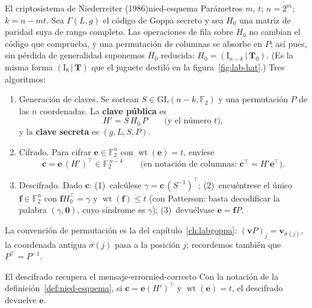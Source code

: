 \documentclass[11pt,a4paper,oneside]{report}
\newcommand{\F}{\mathbb{F}}
\newcommand{\wt}{\operatorname{wt}}
\newcommand{\Tmat}{\mathbf{T}}          %
\newcommand{\ve}{\mathbf{e}}
\newcommand{\vc}{\mathbf{c}}
\newcommand{\vv}{\mathbf{v}}
\newcommand{\vf}{\mathbf{f}}
\newcommand{\Ftwo}{\F_2}
\begin{document}
\begin{definicion}{El criptosistema de Niederreiter (1986)}{nied-esquema}
Parámetros $m$, $t$; $n=2^m$; $k=n-mt$. Sea $\Gamma(L,g)$ el código de
Goppa secreto y sea $H_0$ una matriz de paridad suya de rango completo.
Las operaciones de fila sobre $H_0$ no cambian el código que comprueba,
y una permutación de columnas se absorbe en $P$; así pues, sin pérdida
de generalidad suponemos $H_0$ reducida:
$H_0=(\mathrm{I}_{n-k}\,|\,\Tmat_0)$. (Es la misma forma
$(\mathrm{I}_8\,|\,\Tmat)$ que el juguete destiló en la
figura~\ref{fig:lab-hat}.) Tres algoritmos:
\begin{enumerate}[label=\textsc{\Alph*.},leftmargin=1.9em,itemsep=3pt]
  \item \textsf{Generación de claves.} Se sortean $S\in
        \mathrm{GL}(n-k,\Ftwo)$ y una permutación $P$ de las $n$
        coordenadas. La \textbf{clave pública} es
        \begin{equation}
          H' = S\,H_0\,P \qquad\text{(y el número } t),
          \label{eq:nied-pk}
        \end{equation}
        y la \textbf{clave secreta} es $(g,L,S,P)$.
  \item \textsf{Cifrado.} Para cifrar $\ve\in\Ftwo^n$ con
        $\wt(\ve)=t$, envíese
        \begin{equation}
          \vc = \ve\,(H')^{\top}\in\Ftwo^{\,n-k}
          \qquad
          \bigl(\text{en notación de columnas: }\vc^{\top}=H'\ve^{\top}\bigr).
          \label{eq:nied-enc}
        \end{equation}
  \item \textsf{Descifrado.} Dado $\vc$: (1)~calcúlese
        $\gamma=\vc\,(S^{-1})^{\top}$; (2)~encuéntrese el único
        $\vf\in\Ftwo^n$ con $\vf H_0^{\top}=\gamma$ y $\wt(\vf)\le t$
        (con Patterson: basta decodificar la palabra
        $(\gamma,\mathbf{0})$, cuyo síndrome es $\gamma$);
        (3)~devuélvase $\ve=\vf P$.
\end{enumerate}
\end{definicion}

La convención de permutación es la del capítulo~\ref{ch:labgoppa}:
$(\vv P)_j=\vv_{\sigma(j)}$, la coordenada antigua $\sigma(j)$ pasa a
la posición $j$; recordemos también que $P^{\top}=P^{-1}$.

\begin{proposicion}{El descifrado recupera el mensaje-error}{nied-correcto}
Con la notación de la definición~\ref{def:nied-esquema}, si
$\vc=\ve(H')^{\top}$ y $\wt(\ve)=t$, el descifrado devuelve $\ve$.
\end{proposicion}
\end{document}

